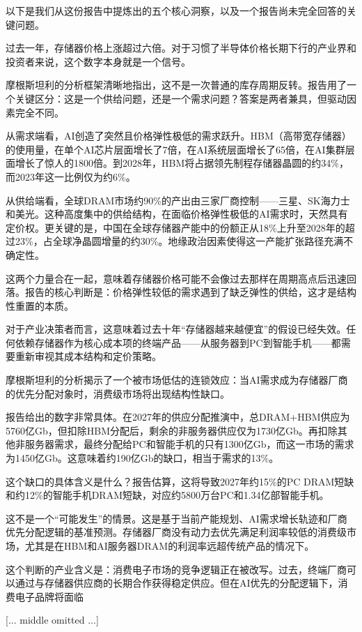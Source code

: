 \documentclass[11pt]{ctexart}
\begin{document}
以下是我们从这份报告中提炼出的五个核心洞察，以及一个报告尚未完全回答的关键问题。

过去一年，存储器价格上涨超过六倍。对于习惯了半导体价格长期下行的产业界和投资者来说，这个数字本身就是一个信号。

摩根斯坦利的分析框架清晰地指出，这不是一次普通的库存周期反转。报告用了一个关键区分：这是一个供给问题，还是一个需求问题？答案是两者兼具，但驱动因素完全不同。

从需求端看，AI创造了突然且价格弹性极低的需求跃升。HBM（高带宽存储器）的使用量，在单个AI芯片层面增长了7倍，在AI系统层面增长了65倍，在AI集群层面增长了惊人的1800倍。到2028年，HBM将占据领先制程存储器晶圆的约34\%，而2023年这一比例仅为约6\%。

从供给端看，全球DRAM市场约90\%的产出由三家厂商控制——三星、SK海力士和美光。这种高度集中的供给结构，在面临价格弹性极低的AI需求时，天然具有定价权。更关键的是，中国在全球存储器产能中的份额正从18\%上升至2028年的超过23\%，占全球净晶圆增量的约30\%。地缘政治因素使得这一产能扩张路径充满不确定性。

这两个力量合在一起，意味着存储器价格可能不会像过去那样在周期高点后迅速回落。报告的核心判断是：价格弹性较低的需求遇到了缺乏弹性的供给，这才是结构性重置的本质。

对于产业决策者而言，这意味着过去十年“存储器越来越便宜”的假设已经失效。任何依赖存储器作为核心成本项的终端产品——从服务器到PC到智能手机——都需要重新审视其成本结构和定价策略。

摩根斯坦利的分析揭示了一个被市场低估的连锁效应：当AI需求成为存储器厂商的优先分配对象时，消费级市场将出现结构性缺口。

报告给出的数字非常具体。在2027年的供应分配推演中，总DRAM+HBM供应为5760亿Gb，但扣除HBM分配后，剩余的非服务器供应仅为1730亿Gb。再扣除其他非服务器需求，最终分配给PC和智能手机的只有1300亿Gb，而这一市场的需求为1450亿Gb。这意味着约190亿Gb的缺口，相当于需求的13\%。

这个缺口的具体含义是什么？报告估算，这将导致2027年约15\%的PC DRAM短缺和约12\%的智能手机DRAM短缺，对应约5800万台PC和1.34亿部智能手机。

这不是一个“可能发生”的情景。这是基于当前产能规划、AI需求增长轨迹和厂商优先分配逻辑的基准预测。存储器厂商没有动力去优先满足利润率较低的消费级市场，尤其是在HBM和AI服务器DRAM的利润率远超传统产品的情况下。

这个判断的产业含义是：消费电子市场的竞争逻辑正在被改写。过去，终端厂商可以通过与存储器供应商的长期合作获得稳定供应。但在AI优先的分配逻辑下，消费电子品牌将面临

[... middle omitted ...]
\end{document}

